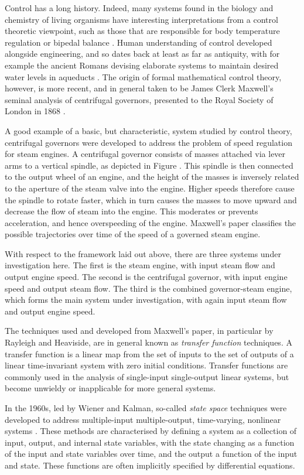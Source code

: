 Control has a long history. Indeed, many systems found in the biology and chemistry of living organisms have interesting interpretations from a control theoretic viewpoint, such as those that are responsible for body temperature regulation or bipedal balance \cite{So2}. Human understanding of control developed alongside engineering, and so dates back at least as far as antiquity, with for example the ancient Romans devising elaborate systems to maintain desired water levels in aqueducts \cite{So}. The origin of formal mathematical control theory, however, is more recent, and in general taken to be James Clerk Maxwell's seminal analysis of centrifugal governors, presented to the Royal Society of London in 1868 \cite{CM}. 

A good example of a basic, but characteristic, system studied by control theory,
centrifugal governors were developed to address the problem of speed regulation
for steam engines. A centrifugal governor consists of masses attached via lever
arms to a vertical spindle, as depicted in Figure . This spindle is then connected to the output wheel of an engine, and the height of the masses is inversely related to the aperture of the steam valve into the engine. Higher speeds therefore cause the spindle to rotate faster, which in turn causes the masses to move upward and decrease the flow of steam into the engine. This moderates or prevents acceleration, and hence overspeeding of the engine. Maxwell's paper classifies the possible trajectories over time of the speed of a governed steam engine. 

With respect to the framework laid out above, there are three systems under investigation here. The first is the steam engine, with input steam flow and output engine speed. The second is the centrifugal governor, with input engine speed and output steam flow. The third is the combined governor-steam engine, which forms the main system under investigation, with again input steam flow and output engine speed.

The techniques used and developed from Maxwell's paper, in particular by Rayleigh and Heaviside, are in general known as \emph{transfer function} techniques. A transfer function is a linear map from the set of inputs to the set of outputs of a linear time-invariant system with zero initial conditions. Transfer functions are commonly used in the analysis of single-input single-output linear systems, but become unwieldy or inapplicable for more general systems.

In the 1960s, led by Wiener and Kalman, so-called \emph{state space} techniques were developed to address multiple-input multiple-output, time-varying, nonlinear systems \cite{Fr}. These methods are characterised by defining a system as a collection of input, output, and internal state variables, with the state changing as a function of the input and state variables over time, and the output a function of the input and state. These functions are often implicitly specified by differential equations.

